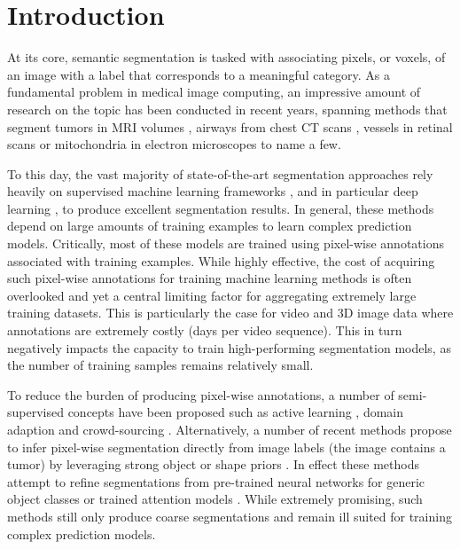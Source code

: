 \section{Introduction}
\label{sec:intro}

At its core, semantic segmentation is tasked with associating pixels, or voxels, of an image with a label that corresponds to a meaningful category. As a fundamental problem in medical image computing, an impressive amount of research on the topic has been conducted in recent years, spanning methods that segment tumors in MRI volumes \cite{zikic2014,menze15}, airways from chest CT scans \cite{miyawaki17}, vessels in retinal scans \cite{pilch12} or mitochondria in electron microscopes \cite{seyed13} to name a few.

To this day, the vast majority of state-of-the-art segmentation approaches rely heavily on supervised machine learning frameworks \cite{sweeney14,menze15}, and in particular deep learning \cite{garcia17}, to produce excellent segmentation results. In general, these methods depend on large amounts of training examples to learn complex prediction models. Critically, most of these models are trained using pixel-wise annotations associated with training examples. While highly effective, the cost of acquiring such pixel-wise annotations for training machine learning methods is often overlooked and yet a central limiting factor for aggregating extremely large training datasets. This is particularly the case for video and 3D image data where annotations are extremely costly (\ie days per video sequence). This in turn negatively impacts the capacity to train high-performing segmentation models, as the number of training samples remains relatively small.

To reduce the burden of producing pixel-wise annotations, a number of semi-supervised concepts have been proposed such as active learning \cite{KonSznFua15}, domain adaption \cite{tzeng17} and crowd-sourcing \cite{mavandadi12}. Alternatively, a number of recent methods propose to infer pixel-wise segmentation directly from image labels (\ie the image contains a tumor) by leveraging strong object or shape priors \cite{menze10}. In effect these methods attempt to refine segmentations from pre-trained neural networks for generic object classes \cite{su15} or trained attention models \cite{kingma14}. While extremely promising, such methods still only produce coarse segmentations and remain ill suited for training complex prediction models.


